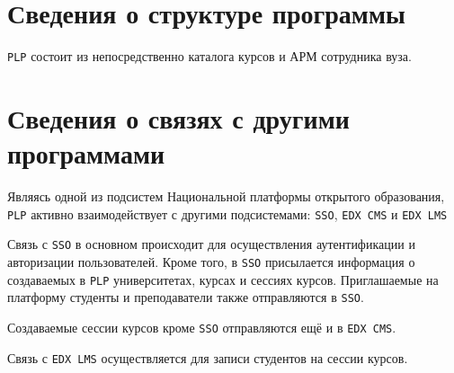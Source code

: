 \section{Сведения о структуре программы}
\texttt{PLP} состоит из непосредственно каталога курсов и АРМ сотрудника вуза.
\section{Сведения о связях с другими программами}
Являясь одной из подсистем Национальной платформы открытого образования,
\texttt{PLP} активно взаимодействует с другими подсистемами:
\texttt{SSO}, \texttt{EDX CMS} и \texttt{EDX LMS}

Связь с \texttt{SSO} в основном происходит для осуществления аутентификации и авторизации пользователей.
Кроме того, в \texttt{SSO} присылается информация о создаваемых в \texttt{PLP}
университетах, курсах и сессиях курсов. Приглашаемые на платформу студенты и преподаватели
также отправляются в \texttt{SSO}.

Создаваемые сессии курсов кроме \texttt{SSO} отправляются ещё и в \texttt{EDX CMS}.

Связь с \texttt{EDX LMS} осуществляется для записи студентов на сессии курсов.
